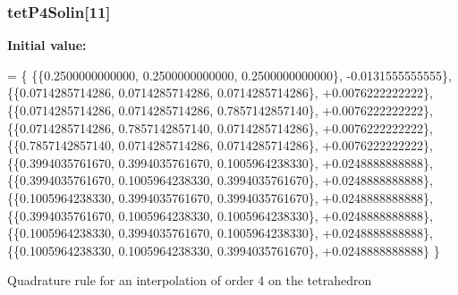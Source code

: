 \subsubsection[{tet\-P4\-Solin}]{ tet\-P4\-Solin[11]}\label{GaussQuadratureTet_8cc_a231745409a1489fc019bf03bec1d3903}
{\bfseries Initial value\-:}
\begin{DoxyCode}
= \{
  \{\{0.2500000000000, 0.2500000000000, 0.2500000000000\}, -0.0131555555555\},
  \{\{0.0714285714286, 0.0714285714286, 0.0714285714286\}, +0.0076222222222\},
  \{\{0.0714285714286, 0.0714285714286, 0.7857142857140\}, +0.0076222222222\},
  \{\{0.0714285714286, 0.7857142857140, 0.0714285714286\}, +0.0076222222222\},
  \{\{0.7857142857140, 0.0714285714286, 0.0714285714286\}, +0.0076222222222\},
  \{\{0.3994035761670, 0.3994035761670, 0.1005964238330\}, +0.0248888888888\},
  \{\{0.3994035761670, 0.1005964238330, 0.3994035761670\}, +0.0248888888888\},
  \{\{0.1005964238330, 0.3994035761670, 0.3994035761670\}, +0.0248888888888\},
  \{\{0.3994035761670, 0.1005964238330, 0.1005964238330\}, +0.0248888888888\},
  \{\{0.1005964238330, 0.3994035761670, 0.1005964238330\}, +0.0248888888888\},
  \{\{0.1005964238330, 0.1005964238330, 0.3994035761670\}, +0.0248888888888\}
\}
\end{DoxyCode}
Quadrature rule for an interpolation of order 4 on the tetrahedron 

